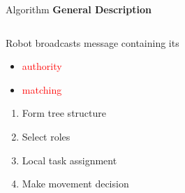 \begin{frame}{Algorithm}
  \textbf{General Description}
  \begin{columns}[T] %
   \begin{column}{.45\textwidth}
     Robot broadcasts message containing its
     \begin{itemize}
     \item \textcolor{red}{authority} 
     \item \textcolor{red}{matching}
     \end{itemize}

     \begin{enumerate}
     \item Form tree structure
     \item Select roles
     \item Local task assignment
     \item Make movement decision
     \end{enumerate}
    \end{column}%
    \begin{column}{.45\textwidth}
      
    \end{column}%
  \end{columns}
\end{frame}